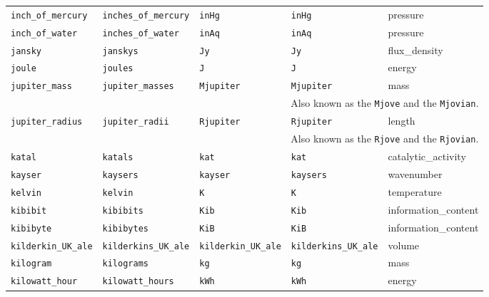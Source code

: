 \begin{landscape}
\begin{center}
\begin{longtable}{|lllll|}
{\tt\footnotesize inch\_of\_mercury} & {\tt\footnotesize inches\_of\_mercury} & {\tt\footnotesize inHg} & {\tt\footnotesize inHg} & pressure \\
{\tt\footnotesize inch\_of\_water} & {\tt\footnotesize inches\_of\_water} & {\tt\footnotesize inAq} & {\tt\footnotesize inAq} & pressure \\
{\tt\footnotesize jansky} & {\tt\footnotesize janskys} & {\tt\footnotesize Jy} & {\tt\footnotesize Jy} & flux\_density \\
{\tt\footnotesize joule} & {\tt\footnotesize joules} & {\tt\footnotesize J} & {\tt\footnotesize J} & energy \\
{\tt\footnotesize jupiter\_mass} & {\tt\footnotesize jupiter\_masses} & {\tt\footnotesize Mjupiter} & {\tt\footnotesize Mjupiter} & mass \\
\multicolumn{5}{|r|}{\footnotesize Also known as the {\tt Mjove} and the {\tt Mjovian}.} \\
{\tt\footnotesize jupiter\_radius} & {\tt\footnotesize jupiter\_radii} & {\tt\footnotesize Rjupiter} & {\tt\footnotesize Rjupiter} & length \\
\multicolumn{5}{|r|}{\footnotesize Also known as the {\tt Rjove} and the {\tt Rjovian}.} \\
{\tt\footnotesize katal} & {\tt\footnotesize katals} & {\tt\footnotesize kat} & {\tt\footnotesize kat} & catalytic\_activity \\
{\tt\footnotesize kayser} & {\tt\footnotesize kaysers} & {\tt\footnotesize kayser} & {\tt\footnotesize kaysers} & wavenumber \\
{\tt\footnotesize kelvin} & {\tt\footnotesize kelvin} & {\tt\footnotesize K} & {\tt\footnotesize K} & temperature \\
{\tt\footnotesize kibibit} & {\tt\footnotesize kibibits} & {\tt\footnotesize Kib} & {\tt\footnotesize Kib} & information\_content \\
{\tt\footnotesize kibibyte} & {\tt\footnotesize kibibytes} & {\tt\footnotesize KiB} & {\tt\footnotesize KiB} & information\_content \\
{\tt\footnotesize kilderkin\_UK\_ale} & {\tt\footnotesize kilderkins\_UK\_ale} & {\tt\footnotesize kilderkin\_UK\_ale} & {\tt\footnotesize kilderkins\_UK\_ale} & volume \\
{\tt\footnotesize kilogram} & {\tt\footnotesize kilograms} & {\tt\footnotesize kg} & {\tt\footnotesize kg} & mass \\
{\tt\footnotesize kilowatt\_hour} & {\tt\footnotesize kilowatt\_hours} & {\tt\footnotesize kWh} & {\tt\footnotesize kWh} & energy \\

\end{longtable}
\end{center}
\end{landscape}
